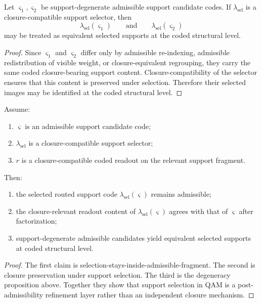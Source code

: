 \begin{proposition}
Let $\varsigma_1,\varsigma_2$ be support-degenerate admissible support candidate codes. If $\lambda_{\mathrm{sel}}$ is a closure-compatible support selector, then
\[
\lambda_{\mathrm{sel}}(\varsigma_1)
\qquad\text{and}\qquad
\lambda_{\mathrm{sel}}(\varsigma_2)
\]
may be treated as equivalent selected supports at the coded structural level.
\end{proposition}

\begin{proof}
Since $\varsigma_1$ and $\varsigma_2$ differ only by admissible re-indexing, admissible redistribution of visible weight, or closure-equivalent regrouping, they carry the same coded closure-bearing support content. Closure-compatibility of the selector ensures that this content is preserved under selection. Therefore their selected images may be identified at the coded structural level.
\end{proof}

\begin{theorem}
Assume:
\begin{enumerate}
\item $\varsigma$ is an admissible support candidate code;
\item $\lambda_{\mathrm{sel}}$ is a closure-compatible support selector;
\item $r$ is a closure-compatible coded readout on the relevant support fragment.
\end{enumerate}
Then:
\begin{enumerate}
\item the selected routed support code $\lambda_{\mathrm{sel}}(\varsigma)$ remains admissible;
\item the closure-relevant readout content of $\lambda_{\mathrm{sel}}(\varsigma)$ agrees with that of $\varsigma$ after factorization;
\item support-degenerate admissible candidates yield equivalent selected supports at coded structural level.
\end{enumerate}
\end{theorem}

\begin{proof}
The first claim is selection-stays-inside-admissible-fragment. The second is closure preservation under support selection. The third is the degeneracy proposition above. Together they show that support selection in QAM is a post-admissibility refinement layer rather than an independent closure mechanism.
\end{proof}

